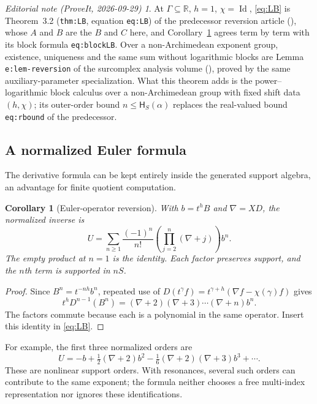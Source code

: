 \documentclass[11pt,a4paper]{article}
\newtheorem{corollary}[theorem]{Corollary}
\theoremstyle{definition}
\theoremstyle{remark}
\newtheorem*{ednote}{Editorial note (ProveIt, 2026-09-29)}
\newcommand{\R}{\mathbb R}
\newcommand{\Id}{\operatorname{Id}}
\newcommand{\depth}{\mathsf H}
\begin{document}
\begin{ednote}\label{ed:reversion-other-proofs}
At $\Gamma\subseteq\R$, $h=1$, $\chi=\Id$, \eqref{eq:LB} is Theorem~3.2
(\texttt{thm:LB}, equation \texttt{eq:LB}) of the predecessor reversion
article
(),
whose $A$ and $B$ are the $B$ and $C$ here, and Corollary~\ref{cor:EulerLB}
agrees term by term with its block formula \texttt{eq:blockLB}. Over a
non-Archimedean exponent group, existence, uniqueness and the same sum
without logarithmic blocks are Lemma \texttt{e:lem-reversion} of the
surcomplex analysis volume
(),
proved by the same auxiliary-parameter specialization. What this theorem
adds is the power--logarithmic block calculus over a non-Archimedean group
with fixed shift data $(h,\chi)$; its outer-order bound
$n\le\depth_S(\alpha)$ replaces the real-valued bound \texttt{eq:rbound}
of the predecessor.
\end{ednote}

\subsection{A normalized Euler formula}
The derivative formula can be kept entirely inside the generated support
algebra, an advantage for finite quotient computation.

\begin{corollary}[Euler-operator reversion]\label{cor:EulerLB}
With $b=t^hB$ and $\nabla=XD$, the normalized inverse is
\begin{equation}\label{eq:EulerLB}
 \boxed{\quad
 U=\sum_{n\ge1}\frac{(-1)^n}{n!}
       \left(\prod_{j=2}^{n}(\nabla+j)\right)b^n.
 \quad}
\end{equation}
The empty product at $n=1$ is the identity. Each factor preserves support,
and the $n$th term is supported in $nS$.
\end{corollary}
\begin{proof}
Since $B^n=t^{-nh}b^n$, repeated use of
$D(t^\gamma f)=t^{\gamma+h}(\nabla f-\chi(\gamma)f)$ gives
\[
 t^hD^{n-1}(B^n)
  =(\nabla+2)(\nabla+3)\cdots(\nabla+n)b^n.
\]
The factors commute because each is a polynomial in the same operator.
Insert this identity in \eqref{eq:LB}.
\end{proof}

For example, the first three normalized orders are
\[
 U=-b+\tfrac12(\nabla+2)b^2
      -\tfrac16(\nabla+2)(\nabla+3)b^3+\cdots.
\]
These are nonlinear support orders. With resonances, several such orders
can contribute to the same exponent; the formula neither chooses a free
multi-index representation nor ignores these identifications.
\end{document}
